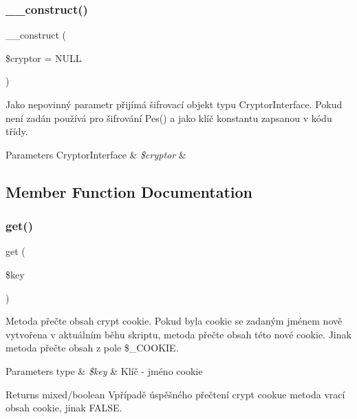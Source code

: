 \subsubsection{\texorpdfstring{\+\_\+\+\_\+construct()}{\_\_construct()}}
{\footnotesize\ttfamily \+\_\+\+\_\+construct (\begin{DoxyParamCaption}\item[{Cryptor\+Interface}]{\$cryptor = {\ttfamily NULL} }\end{DoxyParamCaption})}

Jako nepovinný parametr přijímá šifrovací objekt typu Cryptor\+Interface. Pokud není zadán používá pro šifrování Pes() a jako klíč konstantu zapsanou v kódu třídy.


\begin{DoxyParams}[1]{Parameters}
Cryptor\+Interface & {\em \$cryptor} & \\
\hline
\end{DoxyParams}


\subsection{Member Function Documentation}
\mbox{\label{class_pes_1_1_storage_1_1_crypted_cookie_storage_a24a9bf83a1002d46ece83a93d14bd921}} 
\subsubsection{\texorpdfstring{get()}{get()}}
{\footnotesize\ttfamily get (\begin{DoxyParamCaption}\item[{}]{\$key }\end{DoxyParamCaption})}

Metoda přečte obsah crypt cookie. Pokud byla cookie se zadaným jménem nově vytvořena v aktuálním běhu skriptu, metoda přečte obsah této nové cookie. Jinak metoda přečte obsah z pole \$\+\_\+\+C\+O\+O\+K\+IE. 
\begin{DoxyParams}[1]{Parameters}
type & {\em \$key} & Klíč -\/ jméno cookie \\
\hline
\end{DoxyParams}
\begin{DoxyReturn}{Returns}
mixed/boolean Vpřípadě úspěšného přečtení crypt cookue metoda vrací obsah cookie, jinak F\+A\+L\+SE. 
\end{DoxyReturn}



